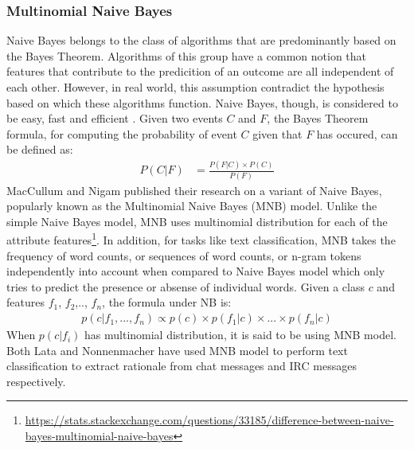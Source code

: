 \documentclass[a4paper,12pt,twoside]{report}
\begin{document}
\subsubsection{Multinomial Naive Bayes}
Naive Bayes belongs to the class of algorithms that are predominantly based on the Bayes Theorem. Algorithms of this group have a common notion that features that contribute to the predicition of an outcome are all independent of each other. However, in real world, this assumption contradict the hypothesis based on which these algorithms function. Naive Bayes, though, is considered to be easy, fast and efficient \cite{Rennie2003}. 
\newline \newline
Given two events $C$ and $F$, the Bayes Theorem formula, for computing the probability of event $C$ given that $F$ has occured, can be defined as: 
\begin{align*}
P(C|F) &= \frac{P(F|C) \times P(C)}{P(F)}
\end{align*}
\newline
MacCullum and Nigam \cite{McCallum1998a} published their research on a variant of Naive Bayes, popularly known as the Multinomial Naive Bayes (\acs{MNB}) model. Unlike the simple Naive Bayes model, \acs{MNB} uses multinomial distribution for each of the attribute features\footnote{\url{https://stats.stackexchange.com/questions/33185/difference-between-naive-bayes-multinomial-naive-bayes}}. In addition, for tasks like text classification, \acs{MNB} takes the frequency of word counts, or sequences of word counts, or n-gram tokens independently into account when compared to Naive Bayes model which only tries to predict the presence or absense of individual words. 
\newline \newline
Given a class $c$ and features $f_1$, $f_2$,.., $f_n$, the formula under NB is:
\begin{align*}
p(c|f_1,...,f_n) \propto p(c) \times p(f_1|c) \times ... \times p(f_n|c)
\end{align*}
When $p(c|f_i)$ has multinomial distribution, it is said to be using \acs{MNB} model. Both Lata \cite{Lata2016} and Nonnenmacher\cite{Nonnenmacher2017} have used \acs{MNB} model to perform text classification to extract rationale from chat messages and \acs{IRC} messages respectively. 
\end{document}
